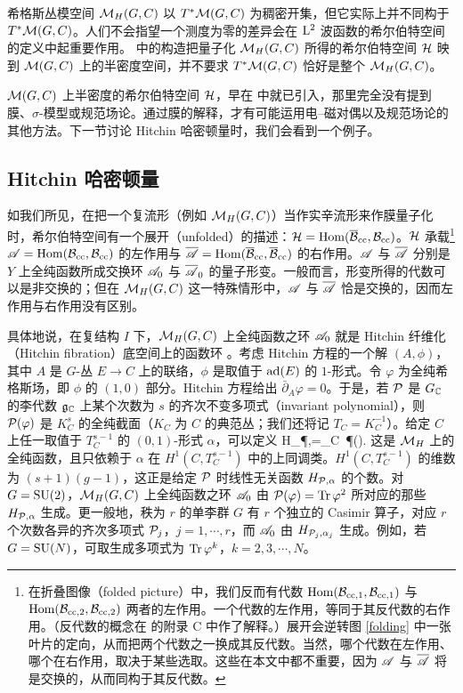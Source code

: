 希格斯丛模空间 $\M_H(G,C)$ 以 $T^*\M(G,C)$ 为稠密开集，但它实际上并不同构于 $T^*\M(G,C)$。人们不会指望一个测度为零的差异会在 $\lmark^2$ 波函数的希尔伯特空间的定义中起重要作用。\cite{GW} 中的构造把量子化 $\M_H(G,C)$ 所得的希尔伯特空间 $\H$ 映到 $\M(G,C)$ 上的半密度空间，并不要求 $T^*\M(G,C)$ 恰好是整个 $\M_H(G,C)$。

$\M(G,C)$ 上半密度的希尔伯特空间 $\H$，早在 \cite{EFK} 中就已引入，那里完全没有提到膜、$\sigma$-模型或规范场论。通过膜的解释，才有可能运用电–磁对偶以及规范场论的其他方法。下一节讨论 Hitchin 哈密顿量时，我们会看到一个例子。


\subsection{Hitchin 哈密顿量}\label{hh}

如我们所见，在把一个复流形（例如 $\M_H(G,C)$）当作实辛流形来作膜量子化时，希尔伯特空间有一个展开（unfolded）的描述：$\H=\Hom(\bar\B_\cc,\B_\cc)$。$\H$ 承载\footnote{在折叠图像（folded picture）中，我们反而有代数 $\Hom(\B_{\cc,1},\B_{\cc,1})$ 与 $\Hom(\B_{\cc,2},\B_{\cc,2})$ 两者的左作用。一个代数的左作用，等同于其反代数的右作用。（反代数的概念在 \cite{GW} 的附录 C 中作了解释。）展开会逆转图 \ref{folding} 中一张叶片的定向，从而把两个代数之一换成其反代数。当然，哪个代数在左作用、哪个在右作用，取决于某些选取。这些在本文中都不重要，因为 $\A$ 与 $\b\A$ 将是交换的，从而同构于其反代数。} $\A=\Hom(\B_\cc,\B_\cc)$ 的左作用与 $\bar\A=\Hom(\bar\B_\cc,\bar\B_\cc)$ 的右作用。$\A$ 与 $\bar\A$ 分别是 $Y$ 上全纯函数所成交换环 $\A_0$ 与 $\bar\A_0$ 的量子形变。一般而言，形变所得的代数可以是非交换的；但在 $\M_H(G,C)$ 这一特殊情形中，$\A$ 与 $\bar\A$ 恰是交换的，因而左作用与右作用没有区别。


具体地说，在复结构 $I$ 下，$\M_H(G,C)$ 上全纯函数之环 $\A_0$ 就是 Hitchin 纤维化（Hitchin fibration）底空间上的函数环 \cite{H,NH}。考虑 Hitchin 方程的一个解 $(A,\phi)$，其中 $A$ 是 $G$-丛 $E\to C$ 上的联络，$\phi$ 是取值于 $\ad(E)$ 的 $1$-形式。令 $\varphi$ 为全纯希格斯场，即 $\phi$ 的 $(1,0)$ 部分。Hitchin 方程给出 $\bar\partial_A\varphi=0$。于是，若 $\P$ 是 $G_\C$ 的李代数 ${\g}_\C$ 上某个次数为 $s$ 的齐次不变多项式（invariant polynomial），则 $\P(\varphi)$ 是 $K_C^s$ 的全纯截面（$K_C$ 为 $C$ 的典范丛；我们还将记 $T_C=K_C^{-1}$）。给定 $C$ 上任一取值于 $T_C^{s-1}$ 的 $(0,1)$-形式 $\alpha$，可以定义
\be\label{juno} H_{\P,\alpha}=\int_C \alpha \,\P(\varphi). \ee
这是 $\M_H$ 上的全纯函数，且只依赖于 $\alpha$ 在 $H^1(C,T_C^{s-1})$ 中的上同调类。$H^1(C,T_C^{s-1})$ 的维数为 $(s+1)(g-1)$，这正是给定 $\P$ 时线性无关函数 $H_{\P,\alpha}$ 的个数。对 $G=\SU(2)$，$\M_H(G,C)$ 上全纯函数之环 $\A_0$ 由 $\P(\varphi)=\Tr\,\varphi^2$ 所对应的那些 $H_{\P,\alpha}$ 生成。更一般地，秩为 $r$ 的单李群 $G$ 有 $r$ 个独立的 Casimir 算子，对应 $r$ 个次数各异的齐次多项式 $\P_j$，$j=1,\cdots,r$，而 $\A_0$ 由 $H_{\P_j,\alpha_j}$ 生成。例如，若 $G=\SU(N)$，可取生成多项式为 $\Tr\,\varphi^{k}$，$k=2,3,\cdots,N$。

